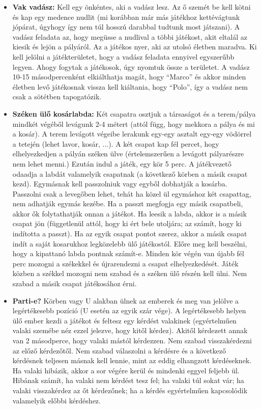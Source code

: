 \documentclass[a4paper, 12pt, twoside, openright]{article}
\begin{document}
\begin{itemize}
\item \textbf{Vak vadász:} Kell egy önkéntes, aki a vadász lesz. Az ő szemét be kell kötni és kap egy medence nudlit (mi korábban már más játékhoz kettévágtunk jópárat, úgyhogy így nem túl hosszú darabbal tudtunk most játszani). A vadász feladata az, hogy megüsse a nudlival a többi játékost, akit eltalál az kiesik és lejön a pályáról. Az a játékos nyer, aki az utolsó életben maradva. Ki kell jelölni a játékterületet, hogy a vadász feladata ennyivel egyszerűbb legyen. Ahogy fogytak a játékosok, úgy nyomtuk össze a területet. A vadász 10-15 másodpercenként elkiálthatja magát, hogy “Marco” és akkor minden életben levő játékosnak vissza kell kiáltania, hogy “Polo”, így a vadász nem csak a sötétben tapogatózik.

\item \textbf{Széken ülő kosárlabda:} Két csapatra osztjuk a társaságot és a terem/pálya mindkét végéből levágunk 2-4 métert (attól függ, hogy mekkora a pálya és mi a kosár). A terem levágott végeibe lerakunk egy-egy asztalt egy-egy vödörrel a tetején (lehet lavor, kosár, ...). A két csapat kap fél percet, hogy elhelyezkedjen a pályán széken ülve (értelemszerűen a levágott pályarészre nem lehet menni.) Ezután indul a játék, egy kör 5 perc. A játékvezető odaadja a labdát valamelyik csapatnak (a következő körben a másik csapat kezd). Egymásnak kell passzolniuk vagy egyből dobhatják a kosárba. Passzolni csak a levegőben lehet, tehát ha közel ül egymáshoz két csapattag, nem adhatják egymás kezébe. Ha a passzt megfogja egy másik csapatbeli, akkor ők folytathatják onnan a játékot. Ha leesik a labda, akkor is a másik csapat jön (függetlenül attól, hogy ki ért bele utoljára; az számít, hogy ki indította a passzt). Ha az egyik csapat pontot szerez, akkor a másik csapat indít a saját kosarukhoz legközelebb ülő játékostól. Előre meg kell beszélni, hogy a kipattanó labda pontnak számít-e. Minden kör végén van újabb fél perc mozogni a székekkel és újrarendezni a csapat elhelyezkedését. Játék közben a székkel mozogni nem szabad és a széken ülő részén kell ülni. Nem szabad a másik csapat játékosához érni.

\item \textbf{Parti-e?} Körben vagy U alakban ülnek az emberek és meg van jelölve a legértékesebb pozíció (U esetén az egyik szár vége). A legértékesebb helyen ülő ember kezdi a játékot és feltesz egy kérdést valakinek (egyértelműen valaki szemébe néz ezzel jelezve, hogy kitől kérdez). Akitől kérdezett annak van 2 másodperce, hogy valaki mástól kérdezzen. Nem szabad visszakérdezni az előző kérdezőtől. Nem szabad válaszolni a kérdésre és a következő kérdésnek teljesen másnak kell lennie, mint az eddig elhangzott kérdéseknek. Ha valaki hibázik, akkor a sor végére kerül és mindenki eggyel feljebb ül. Hibának számít, ha valaki nem kérdést tesz fel; ha valaki túl sokat vár; ha valaki visszakérdez az őt kérdezőnek; ha a kérdés egyértelműen kapcsolódik valamelyik előbbi kérdéshez.


\end{itemize}
\end{document}
